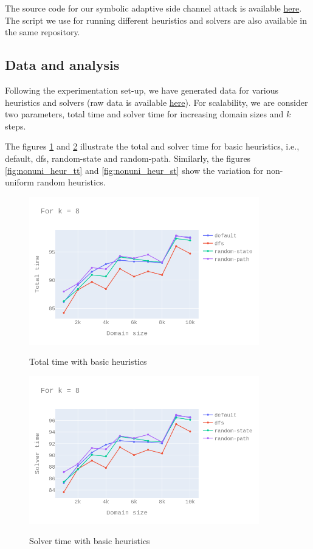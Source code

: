 \documentclass[11pt,a4paper,notitlepage]{article}
\begin{document}
The source code for our symbolic adaptive side channel attack is available \href{https://github.com/irfansha/LBS_projects/tree/master/final_project}{here}.
The script we use for running different heuristics and solvers are also available in the same repository.

\subsection{Data and analysis}
\label{subsec:dataandanalysis}

Following the experimentation set-up, we have generated data for various heuristics and solvers (raw data is available \href{https://github.com/irfansha/LBS_projects/tree/master/final_project/data}{here}).
For scalability, we are consider two parameters, total time and solver time for increasing domain sizes and $k$ steps.

The figures \ref{fig:basic_heur_tt} and \ref{fig:basic_heur_st} illustrate the total and solver time for basic heuristics, i.e., default, dfs, random-state and random-path.
Similarly, the figures \ref{fig:nonuni_heur_tt} and \ref{fig:nonuni_heur_st} show the variation for non-uniform random heuristics.

\begin{figure}[h]
\centering
\includegraphics[width=10cm]{k_8_tt_basic_heur.png}
\label{fig:basic_heur_tt}
\caption{Total time with basic heuristics}
\centering
\end{figure}

\begin{figure}[h]
\centering
\includegraphics[width=10cm]{k_8_st_basic_heur.png}
\label{fig:basic_heur_st}
\caption{Solver time with basic heuristics}
\centering
\end{figure}
\end{document}
